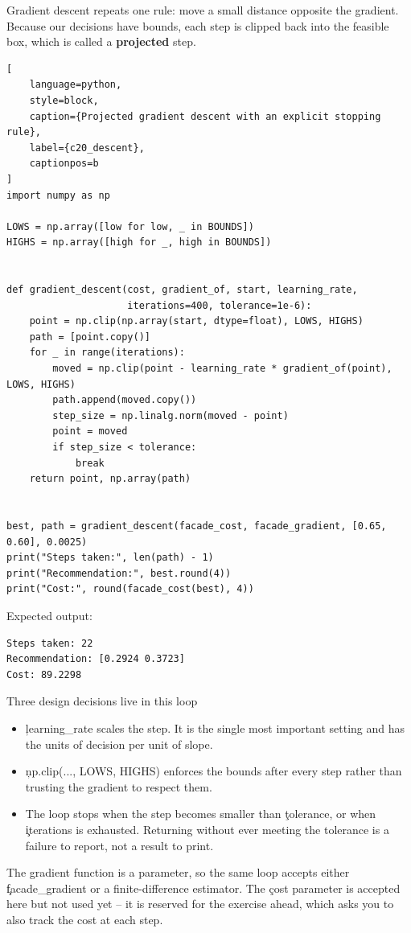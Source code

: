 Gradient descent repeats one rule: move a small distance opposite the gradient.
Because our decisions have bounds, each step is clipped back into the feasible
box, which is called a \textbf{projected} step.

\begin{lstlisting}[
    language=python,
    style=block,
    caption={Projected gradient descent with an explicit stopping rule},
    label={c20_descent},
    captionpos=b
]
import numpy as np

LOWS = np.array([low for low, _ in BOUNDS])
HIGHS = np.array([high for _, high in BOUNDS])


def gradient_descent(cost, gradient_of, start, learning_rate,
                     iterations=400, tolerance=1e-6):
    point = np.clip(np.array(start, dtype=float), LOWS, HIGHS)
    path = [point.copy()]
    for _ in range(iterations):
        moved = np.clip(point - learning_rate * gradient_of(point), LOWS, HIGHS)
        path.append(moved.copy())
        step_size = np.linalg.norm(moved - point)
        point = moved
        if step_size < tolerance:
            break
    return point, np.array(path)


best, path = gradient_descent(facade_cost, facade_gradient, [0.65, 0.60], 0.0025)
print("Steps taken:", len(path) - 1)
print("Recommendation:", best.round(4))
print("Cost:", round(facade_cost(best), 4))
\end{lstlisting}

Expected output:

\begin{lstlisting}[language=text, style=block, caption={Descent from a poor starting design}, label={c20_descent_output}, captionpos=b]
Steps taken: 22
Recommendation: [0.2924 0.3723]
Cost: 89.2298
\end{lstlisting}

\begin{SyntaxBox}{Three design decisions live in this loop}
\begin{itemize}
    \item \c{learning_rate} scales the step. It is the single most important
          setting and has the units of decision per unit of slope.
    \item \c{np.clip(..., LOWS, HIGHS)} enforces the bounds after every step
          rather than trusting the gradient to respect them.
    \item The loop stops when the step becomes smaller than \c{tolerance}, or
          when \c{iterations} is exhausted. Returning without ever meeting the
          tolerance is a failure to report, not a result to print.
\end{itemize}
The gradient function is a parameter, so the same loop accepts either
\c{facade_gradient} or a finite-difference estimator. The \c{cost} parameter is
accepted here but not used yet -- it is reserved for the exercise ahead, which
asks you to also track the cost at each step.
\end{SyntaxBox}

